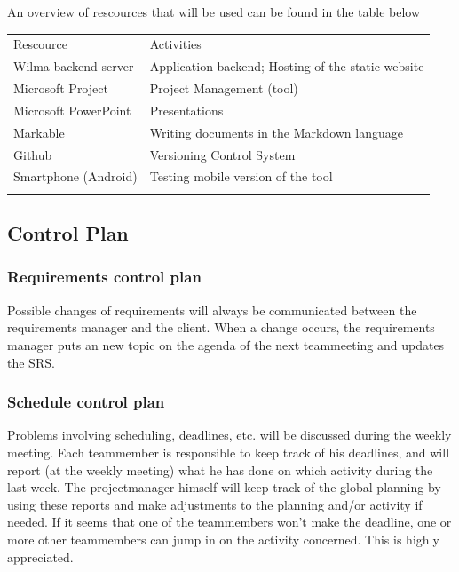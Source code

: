 \documentclass[12pt]{article}
\begin{document}
An overview of rescources that will be used can be found in the table
below

\begin{longtable}[c]{@{}ll@{}}
\hline\noalign{\medskip}
Rescource & Activities
\\\noalign{\medskip}
\hline\noalign{\medskip}
Wilma backend server & Application backend; Hosting of
the static website
\\\noalign{\medskip}
Microsoft Project & Project Management (tool)
\\\noalign{\medskip}
Microsoft PowerPoint & Presentations
\\\noalign{\medskip}
Markable & Writing documents in the Markdown
language
\\\noalign{\medskip}
Github & Versioning Control System
\\\noalign{\medskip}
Smartphone (Android) & Testing mobile version of the tool
\\\noalign{\medskip}
\hline
\end{longtable}

\subsection{Control Plan}\label{control-plan}

\subsubsection{Requirements control
plan}\label{requirements-control-plan}

Possible changes of requirements will always be communicated between the
requirements manager and the client. When a change occurs, the
requirements manager puts an new topic on the agenda of the next
teammeeting and updates the SRS.

\subsubsection{Schedule control plan}\label{schedule-control-plan}

Problems involving scheduling, deadlines, etc. will be discussed during
the weekly meeting. Each teammember is responsible to keep track of his
deadlines, and will report (at the weekly meeting) what he has done on
which activity during the last week. The projectmanager himself will
keep track of the global planning by using these reports and make
adjustments to the planning and/or activity if needed. If it seems that
one of the teammembers won't make the deadline, one or more other
teammembers can jump in on the activity concerned. This is highly
appreciated.
\end{document}
